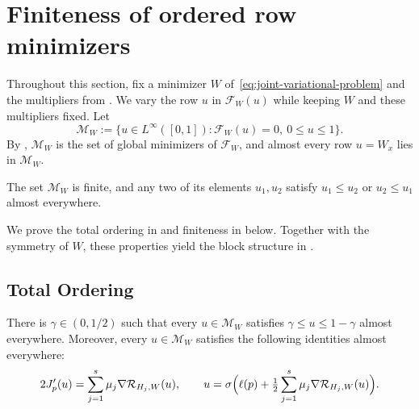 \section{Finiteness of ordered row minimizers}\label{sec:row-criterion}

Throughout this section, fix a minimizer $W$ of~\eqref{eq:joint-variational-problem}
and the multipliers from .
We vary the row $u$ in $\mathcal F_W(u)$ while keeping $W$ and these
multipliers fixed. Let
\[
  \mathcal M_W:=\{ u\in L^\infty([0,1]) : \mathcal F_W(u)=0,\ 0\le u\le 1\}.
\]
By , $\mathcal M_W$ is the set of global minimizers of $\mathcal F_W$,
and almost every row $u=W_x$ lies in $\mathcal M_W$.

\begin{theorem}\label{thm:row-criterion}
The set $\mathcal M_W$ is finite, and any two of
its elements $u_1,u_2$ satisfy $u_1\le u_2$ or $u_2\le u_1$ almost everywhere.
\end{theorem}

We prove the total ordering in  and finiteness in
 below. Together with the symmetry of $W$, these
properties yield the block structure in .

\subsection{Total Ordering}\label{sec:row-ordering}

\begin{lemma}\label{lem:row-interior}
There is $\gamma\in(0,1/2)$ such that every $u\in\mathcal M_W$ satisfies
$\gamma\le u\le1-\gamma$ almost everywhere.  Moreover, every $u\in\mathcal M_W$
satisfies the following identities almost everywhere:
\begin{equation}\label{eq:row-euler}
  2J_p'(u)=\sum_{j=1}^s\mu_j\nabla\mathcal R_{H_j,W}(u),\qquad u=\sigma\Bigl(\ell(p)+\tfrac12\sum_{j=1}^s\mu_j\nabla\mathcal R_{H_j,W}(u)\Bigr).
\end{equation}
\end{lemma}

